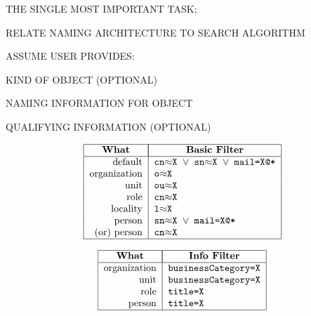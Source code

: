 

\begin{bwslide}

\begin{nrtc}
\item	THE SINGLE MOST IMPORTANT TASK;
    \begin{nrtc}
    \item	RELATE NAMING ARCHITECTURE TO SEARCH ALGORITHM
    \end{nrtc}

\item	ASSUME USER PROVIDES:
    \begin{nrtc}
    \item	KIND OF OBJECT (OPTIONAL)

    \item	NAMING INFORMATION FOR OBJECT

    \item	QUALIFYING INFORMATION (OPTIONAL)
    \end{nrtc}
\end{nrtc}
\end{bwslide}


\begin{bwslide}

\[\begin{tabular}{|r|l|}
\hline
\multicolumn{1}{|c|}{\bf What}&
		\multicolumn{1}{|c|}{\bf Basic Filter}\\
\hline
default&	\tt cn$\approx$X $\lor$ sn$\approx$X $\lor$ mail=X@*\\
organization&	\tt o$\approx$X\\
unit&		\tt ou$\approx$X\\
role&		\tt cn$\approx$X\\
locality&	\tt l$\approx$X\\
person&		\tt sn$\approx$X $\lor$ mail=X@*\\
(or) person&	\tt cn$\approx$X\\
\hline
\end{tabular}\]
\end{bwslide}


\begin{bwslide}

\[\begin{tabular}{|r|l|}
\hline
\multicolumn{1}{|c|}{\bf What}&
		\multicolumn{1}{|c|}{\bf Info Filter}\\
\hline
organization&	\tt businessCategory=X\\
unit&		\tt businessCategory=X\\
role&		\tt title=X\\
person&		\tt title=X\\
\hline
\end{tabular}\]
\end{bwslide}


